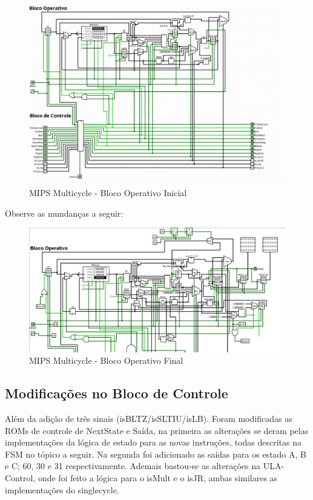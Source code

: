 \documentclass{report}
\begin{document}
        \begin{figure}[h!]
            \centering
            \includegraphics[width=\linewidth]{images/prints/Multicycle/Bloco Operativo Multicycle Antes.png}
            \caption{\label{print:Bloco Operativo Inicial} MIPS Multicycle - Bloco Operativo Inicial}
        \end{figure}

        \clearpage
        Observe as mundanças a seguir:
        \begin{figure}[h!]
            \centering
            \includegraphics[width=\linewidth]{images/prints/Multicycle/Bloco Operativo Multicycle Depois.png}
            \caption{\label{print:Bloco Operativo Final} MIPS Multicycle - Bloco Operativo Final}
        \end{figure}




        \subsection{Modificações no Bloco de Controle}
        Além da adição de três sinais (isBLTZ/isSLTIU/isLB). Foram modificadas as ROMs de controle de NextState e Saída, na primeira as alterações se deram pelas implementações da lógica de estado para as novas instruções, todas descritas na FSM no tópico a seguir.
        Na segunda foi adicionado as saídas para os estado A, B e C; 60, 30 e 31 respectivamente.
        Ademais bastou-se as alterações na ULA-Control, onde foi feito a lógica para o isMult e o isJR, ambas similares as implementações do singlecycle.
\end{document}
